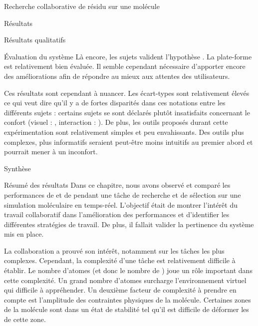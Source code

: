 \documentclass[myfrancais]{mythesis}
\begin{document}
\begin{mychapter}{Recherche collaborative de résidu sur une molécule}
\begin{mysection}{Résultats}
\begin{mysubsection}{Résultats qualitatifs}
\begin{mysubsubsection}{Évaluation du système}
					Là encore, les sujets valident l'hypothèse .
					La plate-forme est relativement bien évaluée.
					Il semble cependant nécessaire d'apporter encore des améliorations afin de répondre au mieux aux attentes des utilisateurs.

					Ces résultats sont cependant à nuancer.
					Les écart-types sont relativement élevés ce qui veut dire qu'il y a de fortes disparités dans ces notations entre les différents sujets : certains sujets se sont déclarés plutôt insatisfaits concernant le confort (visuel : \mynum{2}, interaction : ).
					De plus, les outils proposés durant cette expérimentation sont relativement simples et peu envahissants.
					Des outils plus complexes, plus informatifs seraient peut-être moins intuitifs au premier abord et pourrait mener à un inconfort.
				\end{mysubsubsection}
			\end{mysubsection}
		\end{mysection}
		\begin{mysection}{Synthèse}
			\begin{mysubsection}{Résumé des résultats}
				Dans ce chapitre, nous avons observé et comparé les performances de  et de  pendant une tâche de recherche et de sélection sur une simulation moléculaire en temps-réel.
				L'objectif était de montrer l'intérêt du travail collaboratif dans l'amélioration des performances et d'identifier les différentes stratégies de travail.
				De plus, il fallait valider la pertinence du système mis en place.

				La collaboration a prouvé son intérêt, notamment sur les tâches les plus complexes.
				Cependant, la complexité d'une tâche est relativement difficile à établir.
				Le nombre d'atomes (et donc le nombre de ) joue un rôle important dans cette complexité.
				Un grand nombre d'atomes surcharge l'environnement virtuel qui difficile à appréhender.
				Un deuxième facteur de complexité à prendre en compte est l'amplitude des contraintes physiques de la molécule.
				Certaines zones de la molécule sont dans un état de stabilité tel qu'il est difficile de déformer les  de cette zone.


\end{mysubsection}
\end{mysection}
\end{mychapter}
\end{document}
